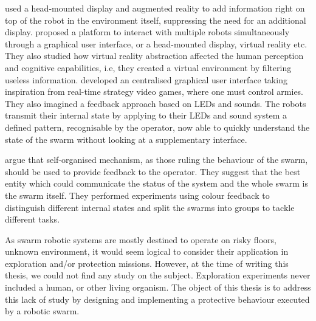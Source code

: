 \documentclass[oneside, a4paper, 12pt]{memoir}
\begin{document}
	\citet{daily2003world} used a head-mounted display and augmented reality to add information right on top of the robot in the environment itself, suppressing the need for an additional display. \citet{baizid2009human} proposed a platform to interact with multiple robots simultaneously through a graphical user interface, or a head-mounted display, virtual reality etc. They also studied how virtual reality abstraction affected the human perception and cognitive capabilities, i.e, they created a virtual environment by filtering useless information. \citet{mclurkin2006speaking} developed an centralised graphical user interface taking inspiration from real-time strategy video games, where one must control armies. They also imagined a feedback approach based on LEDs and sounds. The robots transmit their internal state by applying to their LEDs and sound system a defined pattern, recognisable by the operator, now able to quickly understand the state of the swarm without looking at a supplementary interface.
	
	\citet{podevijn2012self} argue that self-organised mechanism, as those ruling the behaviour of the swarm, should be used to provide feedback to the operator. They suggest that the best entity which could communicate the status of the system and the whole swarm is the swarm itself. They performed experiments using colour feedback to distinguish different internal states and split the swarms into groups to tackle different tasks.\\
	

	
		
		
	
	As swarm robotic systems are mostly destined to operate on risky floors, unknown environment, it would seem logical to consider their application in exploration and/or protection missions. However, at the time of writing this thesis, we could not find any study on the subject. Exploration experiments never included a human, or other living organism. The object of this thesis is to address this lack of study by designing and implementing a protective behaviour executed by a robotic swarm.
	
\end{document}
